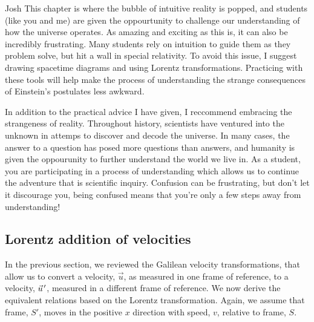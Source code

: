 \begin{studentOpinion}{Josh}{}
	This chapter is where the bubble of intuitive reality is popped, and students (like you and me) are given the oppourtunity to challenge our understanding of how the universe operates. As amazing and exciting as this is, it can also be incredibly frustrating. Many students rely on intuition to guide them as they problem solve, but hit a wall in special relativity. To avoid this issue, I suggest drawing spacetime diagrams and using Lorentz transformations. Practicing with these tools will help make the process of understanding the strange consequences of Einstein's postulates less awkward. 
	
	In addition to the practical advice I have given, I reccommend embracing the strangeness of reality. Throughout history, scientists have ventured into the unknown in attemps to discover and decode the universe. In many cases, the answer to a question has posed more questions than answers, and humanity is given the oppourunity to further understand the world we live in. As a student, you are participating in a process of understanding which allows us to continue the adventure that is scientific inquiry. Confusion can be frustrating, but don't let it discourage you, being confused means that you're only a few steps away from understanding! 
\end{studentOpinion}

\subsection{Lorentz addition of velocities}
In the previous section, we reviewed the Galilean velocity transformations, that allow us to convert a velocity, $\vec u$, as measured in one frame of reference, to a velocity, $\pvec u'$, measured in a different frame of reference. We now derive the equivalent relations based on the Lorentz transformation. Again, we assume that frame, $S'$, moves in the positive $x$ direction with speed, $v$, relative to frame, $S$. 

